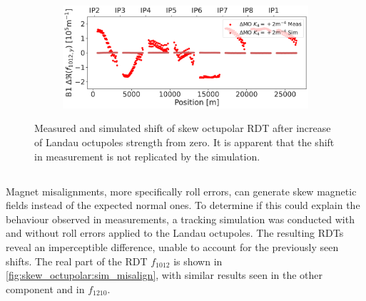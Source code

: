 \begin{figure}[!htb]
    \centering
    \begin{subfigure}{0.8\textwidth}
        \includegraphics[width=\textwidth]{./images/skew_octupoles/f1012_meas_vs_sim_0shift.pdf}
    \end{subfigure}
    \caption{Measured and simulated shift of skew octupolar RDT after increase of Landau octupoles
    strength from zero. It is apparent that the shift in measurement is not replicated by the
    simulation.}
    \label{fig:skew_octupolar:mo_meas_vs_sim_+2}
\end{figure}



\subsection{}

Magnet misalignments, more specifically roll errors, can generate skew magnetic fields instead of
the expected normal ones. To determine if this could explain the behaviour observed in measurements,
a tracking simulation was conducted with and without roll errors applied to the Landau octupoles.
The resulting RDTs reveal an imperceptible difference, unable to account for  the previously seen
shifts. The real part of the RDT $f_{1012}$ is shown in \cref{fig:skew_octupolar:sim_misalign},
with similar results seen in the other component and in $f_{1210}$.

